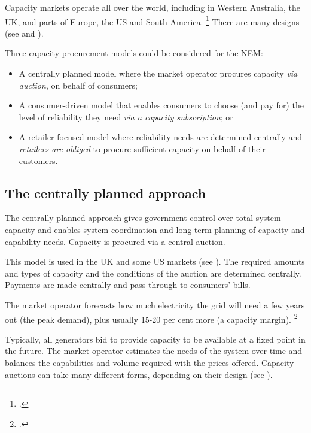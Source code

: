 \documentclass[FrontPage]{grattan}
\begin{document}
Capacity markets operate all over the world, including in Western Australia, the UK, and parts of Europe, the US and South America.%
\footcite{bhagwat2016expertsurvey}
There are many designs (see  and ).

Three capacity procurement models could be considered for the NEM: 
\begin{itemize}
    \item A centrally planned model where the market operator procures capacity \emph{via auction}, on behalf of consumers;
    \item A consumer-driven model that enables consumers to choose (and pay for) the level of reliability they need \emph{via a capacity subscription}; or
    \item A retailer-focused model where reliability needs are determined centrally and \emph{retailers are obliged} to procure sufficient capacity on behalf of their customers.
\end{itemize}


\subsection{The centrally planned approach}\label{subsec:the-centrally-planned-approach} 
The centrally planned approach gives government control over total system capacity and enables system coordination and long-term planning of capacity and capability needs. Capacity is procured via a central auction.

This model is used in the UK and some US markets (see ). The required amounts and types of capacity and the conditions of the auction are determined centrally. Payments are made centrally and pass through to consumers' bills. 

The market operator forecasts how much electricity the grid will need a few years out (the peak demand), plus usually 15-20 per cent more (a capacity margin).%
\footcite{bowring2013capacity}

Typically, all generators bid to provide capacity to be available at a fixed point in the future. The market operator estimates the needs of the system over time and balances the capabilities and volume required with the prices offered. Capacity auctions can take many different forms, depending on their design (see ).
\end{document}
